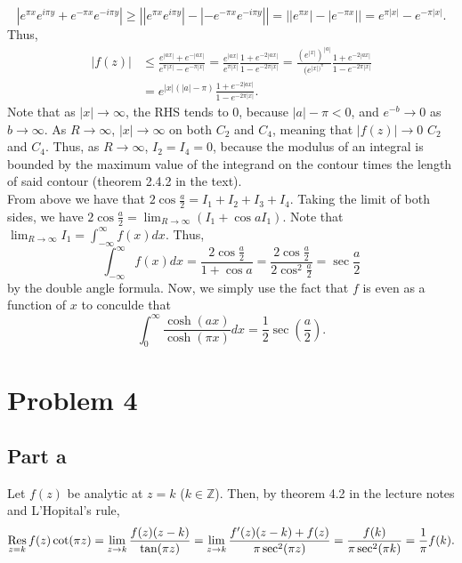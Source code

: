 \documentclass{article}
\begin{document}
\[
|e^{\pi x}e^{i\pi y}+e^{-\pi x}e^{-i\pi y}|\geq\left||e^{\pi x}e^{i\pi y}|-|-e^{-\pi x}e^{-i\pi y}|\right|=\left||e^{\pi x}|-|e^{-\pi x}|\right|=e^{\pi|x|}-e^{-\pi|x|}.
\]
Thus,
\begin{align*}
|f(z)|&\leq\frac{e^{|ax|}+e^{-|ax|}}{e^{\pi|x|}-e^{-\pi|x|}}=\frac{e^{|ax|}}{e^{\pi|x|}}\frac{1+e^{-2|ax|}}{1-e^{-2\pi|x|}}=\frac{(e^{|x|})^{|a|}}{(e^{|x|)^\pi}}\frac{1+e^{-2|ax|}}{1-e^{-2\pi|x|}}\\&=
e^{|x|(|a|-\pi)}\frac{1+e^{-2|ax|}}{1-e^{-2\pi|x|}}.
\end{align*}
Note that as $|x|\to\infty$, the RHS tends to 0, because $|a|-\pi<0$, and $e^{-b}\to0$ as $b\to\infty$. As $R\to\infty$,  $|x|\to\infty$ on both $C_2$ and $C_4$, meaning that $|f(z)|\to0$ $C_2$ and $C_4$. Thus, as $R\to\infty$, $I_2=I_4=0$, because the modulus of an integral is bounded by the maximum value of the integrand on the contour times the length of said contour (theorem 2.4.2 in the text). \\
From above we have that $2\cos\frac{a}{2}=I_1+I_2+I_3+I_4$. Taking the limit of both sides, we have $2\cos\frac{a}{2}=\lim_{R\to\infty}(I_1+\cos aI_1)$. Note that $\lim_{R\to\infty}I_1=\int_{-\infty}^\infty f(x)dx$. Thus,
\[
\int_{-\infty}^\infty f(x)dx=\frac{2\cos\frac{a}{2}}{1+\cos a}=\frac{2\cos\frac{a}{2}}{2\cos^2\frac{a}{2}}=\sec\frac{a}{2}
\]
by the double angle formula. Now, we simply use the fact that $f$ is even as a function of $x$ to conculde that 
\[
\int_0^\infty \frac{\cosh(ax)}{\cosh(\pi x)} d x = \frac{1}{2} \sec\left(\frac{a}{2}\right).
\]

\section{Problem 4}
\subsection{Part a}
Let $f(z)$ be analytic at $z=k$ ($k \in \mathbb{Z}$). Then, by theorem 4.2 in the lecture notes and L'Hopital's rule, 
\[
\operatorname*{Res}_{z=k}f(z)\cot(\pi z)=\lim_{z\to k}\frac{f(z)(z-k)}{\tan(\pi z)}=\lim_{z\to k}\frac{f'(z)(z-k)+f(z)}{\pi\sec^2(\pi z)}=\frac{f(k)}{\pi\sec^2(\pi k)}=\frac{1}{\pi}f(k).
\]
\end{document}
